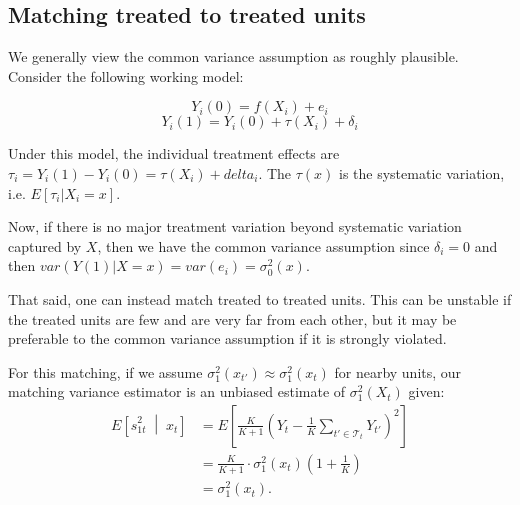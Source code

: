 \documentclass[11pt]{article}
\newcommand{\xmeng}[1]{
  {\color{blue} [xmeng: {#1}]}
 }
\begin{document}
\subsection{Matching treated to treated units}

We generally view the common variance assumption as roughly plausible.
Consider the following working model:

$$ Y_i(0) = f(X_i) + e_{i} $$
$$Y_i(1) = Y_i(0) + \tau(X_i) + \delta_{i}$$

Under this model, the individual treatment effects are $\tau_i = Y_i(1)-Y_i(0) = \tau(X_i) + delta_{i}$.
The $\tau(x)$ is the systematic variation, i.e. $E[ \tau_i | X_i = x ]$.

Now, if there is no major treatment variation beyond systematic variation captured by $X$, then we have the common variance assumption since $\delta_i = 0$ and then $var(Y(1)|X=x) = var( e_i ) = \sigma^2_0(x)$.


That said, one can instead match treated to treated units.
This can be unstable if the treated units are few and are very far from each other, but it may be preferable to the common variance assumption if it is strongly violated.

For this matching, if we assume $\sigma^2_1(x_{t'})\approx\sigma^2_1(x_t)$ for nearby units, our matching variance estimator is an unbiased estimate of $\sigma^2_1(X_t)$ given:
\begin{align*}
  E\!\left[\hat{s}^2_{1t}\;\middle|\; x_t\right] &= E\!\left[ \frac{K}{K+1} \left(Y_t - \frac{1}{K}\sum_{t'\in\mathcal{T}_t} Y_{t'}\right)^2 \right] \\
  &= \frac{K}{K+1}\cdot\sigma^2_1(x_t)\!\left(1+\tfrac{1}{K}\right) \\
  &= \sigma^2_1(x_t).	
\end{align*}
\end{document}
